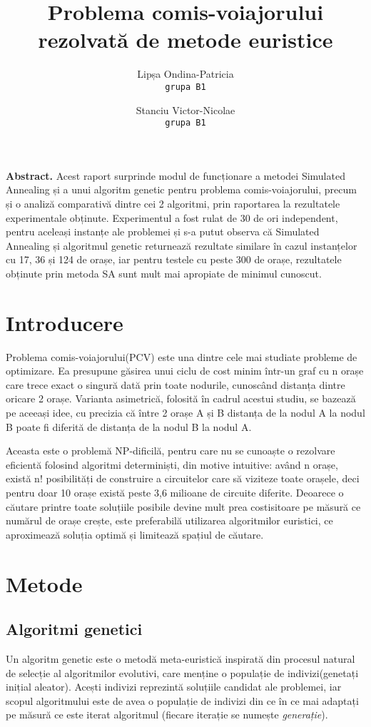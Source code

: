 \documentclass{article}
\author{
  Lipșa Ondina-Patricia\\
  \texttt{grupa B1}
  \and
  Stanciu Victor-Nicolae\\
  \texttt{grupa B1}
}
\title{Problema comis-voiajorului rezolvată de metode euristice }
\begin{document}
\maketitle
\textbf{Abstract.} Acest raport surprinde modul de funcționare a metodei Simulated Annealing și a unui algoritm genetic pentru problema comis-voiajorului, precum și o analiză comparativă dintre cei 2 algoritmi, prin raportarea la rezultatele experimentale obținute. Experimentul a fost rulat de 30 de ori independent, pentru aceleași instanțe ale problemei și s-a putut observa că Simulated Annealing și algoritmul genetic returnează rezultate similare în cazul instanțelor cu 17, 36 și 124 de orașe, iar pentru testele cu peste 300 de orașe, rezultatele obținute prin metoda SA sunt mult mai apropiate de minimul cunoscut.  

\section{Introducere}
Problema comis-voiajorului(PCV) este una dintre cele mai studiate probleme de optimizare. Ea presupune găsirea unui ciclu de cost minim într-un graf cu n orașe care trece exact o singură dată prin toate nodurile, cunoscând distanța dintre oricare 2 orașe. Varianta asimetrică, folosită în cadrul acestui studiu, se bazează pe aceeași idee, cu precizia că între 2 orașe A și B distanța de la nodul A la nodul B poate fi diferită de distanța de la nodul B la nodul A.
\par Aceasta este o problemă NP-dificilă, pentru care nu se cunoaște o rezolvare eficientă folosind algoritmi determiniști, din motive intuitive: având n orașe, există n! posibilități de construire a circuitelor care să viziteze toate orașele, deci pentru doar 10 orașe există peste 3,6 milioane de circuite diferite. Deoarece o căutare printre toate soluțiile posibile devine mult prea costisitoare pe măsură ce numărul de orașe crește, este preferabilă utilizarea algoritmilor euristici, ce aproximează soluția optimă și limitează spațiul de căutare.
\section{Metode}
\subsection{Algoritmi genetici}
Un algoritm genetic este o metodă meta-euristică inspirată din procesul natural de selecție al algoritmilor evolutivi, care menține o populație de indivizi(genetați inițial aleator). Acești indivizi reprezintă soluțiile candidat ale problemei, iar scopul algoritmului este de avea o populație de indivizi din ce în ce mai adaptați pe măsură ce este iterat algoritmul (fiecare iterație se numește \emph{generație}).
\end{document}

